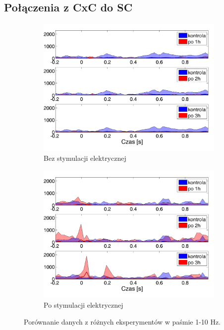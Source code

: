 \documentclass{pracamgr_2}
\begin{document}
\subsection{Połączenia z CxC do SC}
\begin{figure}[h]
	\begin{subfigure}{.5\textwidth}
		\centering
		\includegraphics[width=1.\linewidth]{kontrola15_1-10_z_CxC8_do_SC4.png}
		\caption{Bez stymulacji elektrycznej}
		\label{rys:kon_CxC_SC}
	\end{subfigure}%
	\begin{subfigure}{.5\textwidth}
		\centering
		\includegraphics[width=1.\linewidth]{beta3_1-10_z_CxC5_do_SC4.png}
		\caption{Po stymulacji elektrycznej}
		\label{rys:beta_CxC_SC}
	\end{subfigure}
	\caption{Porównanie danych z różnych eksperymentów w paśmie 1-10 Hz.}
	\label{rys:1_10_CxC_SC}
\end{figure}
\end{document}
